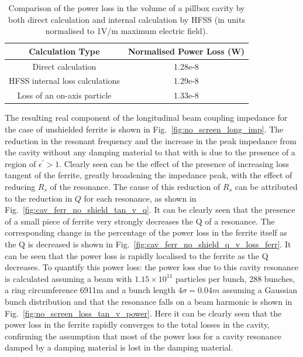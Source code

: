 \begin{table}
\caption{Comparison of the power loss in the volume of a pillbox cavity by both direct calculation and internal calculation by HFSS (in units normalised to 1V/m maximum electric field).}
\begin{center}
\begin{tabular}{c | c }
Calculation Type & Normalised Power Loss (W)\\ \hline
Direct calculation & 1.28e-8\\ \hline
HFSS internal loss calculations & 1.29e-8 \\ \hline
Loss of an on-axis particle & 1.33e-8 \\
\end{tabular}
\end{center}
\label{tab:volume_losses_ferr}
\end{table}


The resulting real component of the longitudinal beam coupling impedance for the case of unshielded ferrite is shown in Fig.~\ref{fig:no_screen_long_imp}. The reduction in the resonant frequency and the increase in the peak impedance from the cavity without any damping material to that with is due to the presence of a region of $\epsilon^{'}>1$. Clearly seen can be the effect of the presence of increasing loss tangent of the ferrite, greatly broadening the impedance peak, with the effect of reducing $R_{s}$ of the resonance. The cause of this reduction of $R_{s}$ can be attributed to the reduction in $Q$ for each resonance, as shown in Fig.~\ref{fig:cav_ferr_no_shield_tan_v_q}. It can be clearly seen that the presence of a small piece of ferrite very strongly decreases the Q of a resonance. The corresponding change in the percentage of the power loss in the ferrite itself as the Q is decreased is shown in Fig.~\ref{fig:cav_ferr_no_shield_q_v_loss_ferr}. It can be seen that the power loss is rapidly localised to the ferrite as the Q decreases. To quantify this power loss: the power loss due to this cavity resonance is calculated assuming a beam with $1.15 \times 10^{11}$ particles per bunch, 288 bunches, a ring circumference 6911m and a bunch length $4\sigma = 0.04m$ assuming a Gaussian bunch distribution and that the resonance falls on a beam harmonic is shown in Fig.~\ref{fig:no_screen_loss_tan_v_power}. Here it can be clearly seen that the power loss in the ferrite rapidly converges to the total losses in the cavity, confirming the assumption that most of the power loss for a cavity resonance damped by a damping material is lost in the damping material. 

